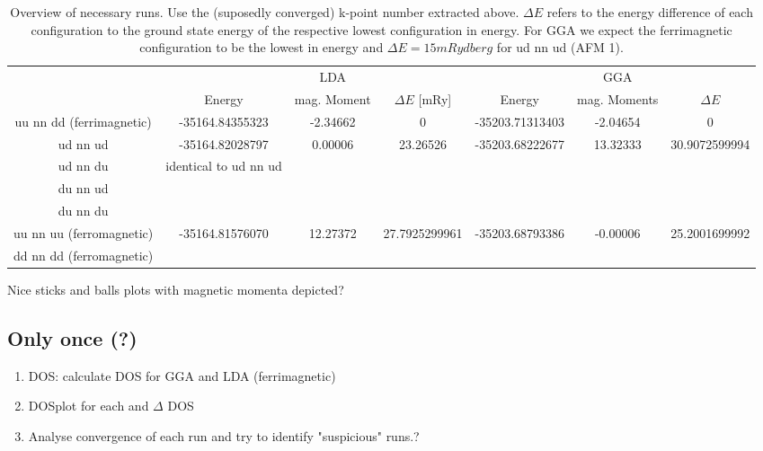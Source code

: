 \documentclass{article}
\begin{document}
\begin{table}
    \centering
    \begin{tabular}{ccccccc}
                                 &                       & LDA         &                  &                 & GGA          &               \\
                                 & Energy                & mag. Moment & $\Delta E$ [mRy] & Energy          & mag. Moments & $\Delta E$    \\
        uu nn dd (ferrimagnetic) & -35164.84355323       & -2.34662    & 0                & -35203.71313403 & -2.04654     & 0             \\
        ud nn ud                 & -35164.82028797       & 0.00006     & 23.26526         & -35203.68222677 & 13.32333     & 30.9072599994 \\
        ud nn du                 & identical to ud nn ud &             &                  &                 &              &               \\
        du nn ud                 &                       &             &                  &                 &              &               \\
        du nn du                 &                       &             &                  &                 &              &               \\
        uu nn uu (ferromagnetic) & -35164.81576070       & 12.27372    & 27.7925299961    & -35203.68793386 & -0.00006     & 25.2001699992 \\
        dd nn dd (ferromagnetic) &                       &             &                  &                 &              &               \\
    \end{tabular}
    \caption{Overview of necessary runs. Use the (suposedly converged) k-point number extracted above. $\Delta E$ refers to the energy difference of each configuration to the ground state energy of the respective lowest configuration in energy. For GGA we expect the ferrimagnetic configuration to be the lowest in energy and $\Delta E = 15 mRydberg$ for ud nn ud (AFM 1). }
    \label{tab:my_label}
\end{table}




Nice sticks and balls plots with magnetic momenta depicted?

\subsection{Only once (?)}
\begin{enumerate}
    \item DOS:	calculate DOS for GGA and LDA (ferrimagnetic)
    \item DOSplot for each and $\Delta$ DOS
    \item Analyse convergence of each run and try to identify "suspicious" runs.?
          \ \end{enumerate}
\end{document}
